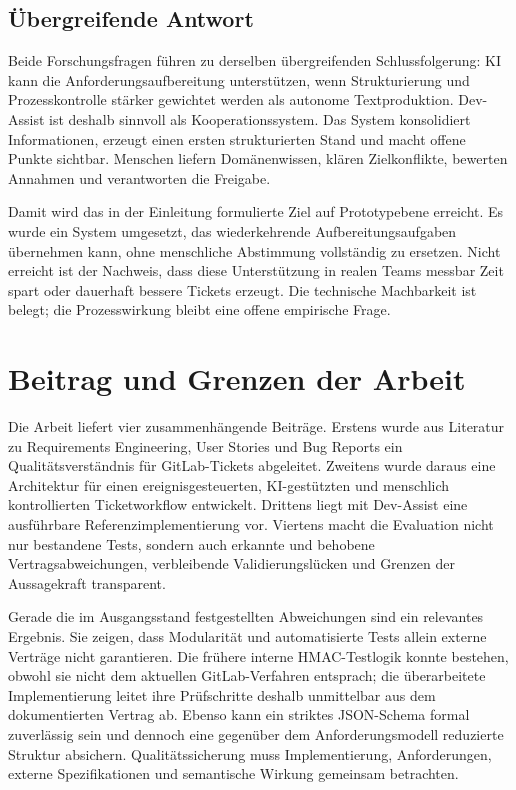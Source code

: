 \subsection{Übergreifende Antwort}

Beide Forschungsfragen führen zu derselben übergreifenden Schlussfolgerung: KI kann die Anforderungsaufbereitung unterstützen, wenn Strukturierung und Prozesskontrolle stärker gewichtet werden als autonome Textproduktion. Dev-Assist ist deshalb sinnvoll als Kooperationssystem. Das System konsolidiert Informationen, erzeugt einen ersten strukturierten Stand und macht offene Punkte sichtbar. Menschen liefern Domänenwissen, klären Zielkonflikte, bewerten Annahmen und verantworten die Freigabe.

Damit wird das in der Einleitung formulierte Ziel auf Prototypebene erreicht. Es wurde ein System umgesetzt, das wiederkehrende Aufbereitungsaufgaben übernehmen kann, ohne menschliche Abstimmung vollständig zu ersetzen. Nicht erreicht ist der Nachweis, dass diese Unterstützung in realen Teams messbar Zeit spart oder dauerhaft bessere Tickets erzeugt. Die technische Machbarkeit ist belegt; die Prozesswirkung bleibt eine offene empirische Frage.

\section{Beitrag und Grenzen der Arbeit}

Die Arbeit liefert vier zusammenhängende Beiträge. Erstens wurde aus Literatur zu Requirements Engineering, User Stories und Bug Reports ein Qualitätsverständnis für GitLab-Tickets abgeleitet. Zweitens wurde daraus eine Architektur für einen ereignisgesteuerten, KI-gestützten und menschlich kontrollierten Ticketworkflow entwickelt. Drittens liegt mit Dev-Assist eine ausführbare Referenzimplementierung vor. Viertens macht die Evaluation nicht nur bestandene Tests, sondern auch erkannte und behobene Vertragsabweichungen, verbleibende Validierungslücken und Grenzen der Aussagekraft transparent.

Gerade die im Ausgangsstand festgestellten Abweichungen sind ein relevantes Ergebnis. Sie zeigen, dass Modularität und automatisierte Tests allein externe Verträge nicht garantieren. Die frühere interne HMAC-Testlogik konnte bestehen, obwohl sie nicht dem aktuellen GitLab-Verfahren entsprach; die überarbeitete Implementierung leitet ihre Prüfschritte deshalb unmittelbar aus dem dokumentierten Vertrag ab. Ebenso kann ein striktes JSON-Schema formal zuverlässig sein und dennoch eine gegenüber dem Anforderungsmodell reduzierte Struktur absichern. Qualitätssicherung muss Implementierung, Anforderungen, externe Spezifikationen und semantische Wirkung gemeinsam betrachten.

